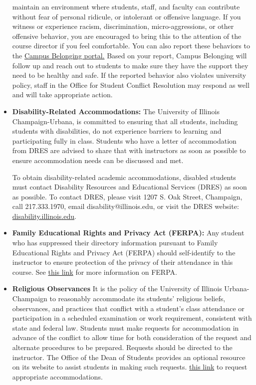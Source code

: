 \documentclass[11pt, a4paper]{article}
\begin{document}
\begin{itemize}
        maintain an environment where students, staff, and faculty can
        contribute without fear of personal ridicule, or intolerant or
        offensive language. If you witness or experience racism,
        discrimination, micro-aggressions, or other offensive behavior, you are
        encouraged to bring this to the attention of the course director if you
        feel comfortable. You can also report these behaviors to the
        \href{https://diversity.illinois.edu/diversity-campus-culture/belonging-resources/}{Campus
        Belonging portal.}
         Based on your report, Campus Belonging will follow up and reach
        out to students to make sure they have the support they need to be
        healthy and safe. If the reported behavior also violates university
        policy, staff in the Office for Student Conflict Resolution may respond
        as well and will take appropriate action.
\item[]\textbf{Disability-Related Accommodations:} The University of Illinois Champaign-Urbana, is committed to ensuring that all students, including students with disabilities, do not experience barriers to learning and participating fully in class. Students who have a letter of accommodation from DRES are advised to share that with instructors as soon as possible to ensure accommodation needs can be discussed and met.

To obtain disability-related academic accommodations, disabled students must contact Disability Resources and Educational Services (DRES) as soon as possible. To contact DRES, please visit 1207 S. Oak Street, Champaign, call 217.333.1970, email disability@illinois.edu, or visit the DRES website: \href{https://www.disability.illinois.edu}{disability.illinois.edu}. 

\item[]\textbf{Family Educational Rights and Privacy Act (FERPA):}
Any student who has suppressed their directory information pursuant to Family
Educational Rights and Privacy Act (FERPA) should self-identify to the
instructor to ensure protection of the privacy of their attendance in this
course. See \href{https://registrar.illinois.edu/ferpa/}{this
link} for more information on FERPA.

\item[]\textbf{Religious Observances}
It is the policy of the University of Illinois Urbana-Champaign to reasonably accommodate its students’ religious beliefs, observances, and practices that conflict with a student’s class attendance or participation in a scheduled examination or work requirement, consistent with state and federal law.  Students must make requests for accommodation in advance of the conflict to allow time for both consideration of the request and alternate procedures to be prepared.  Requests should be directed to the instructor.  The Office of the Dean of Students provides an optional resource on its website to assist students in making such requests.     
\href{https://odos.illinois.edu/resources/students/religious-observances}{this
link} to request appropriate accommodations. 
\end{itemize}
\end{document}
